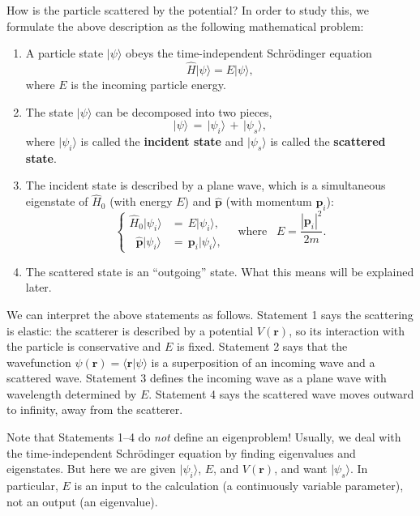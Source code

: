 \documentclass[prx,12pt]{revtex4-2}
\begin{document}
How is the particle scattered by the potential?  In order to study
this, we formulate the above description as the following mathematical
problem:
\begin{enumerate}
\item 
A particle state $|\psi\rangle$ obeys the time-independent
Schr\"odinger equation
\begin{equation}
  \hat{H} |\psi\rangle = E |\psi\rangle,
  \label{scatter1}
\end{equation}
where $E$ is the incoming particle energy.

\item
The state $|\psi\rangle$ can be decomposed into two pieces,
\begin{equation}
  |\psi\rangle \,=\, |\psi_i\rangle \,+\, |\psi_s\rangle,
  \label{scatter2}
\end{equation}
where $|\psi_i\rangle$ is called the \textbf{incident state} and
$|\psi_s\rangle$ is called the \textbf{scattered state}.

\item
The incident state is described by a plane wave, which is a
simultaneous eigenstate of $\hat{H}_0$ (with energy $E$) and
$\hat{\mathbf{p}}$ (with momentum $\mathbf{p}_i$):
\begin{equation}
  \begin{cases}
  \hat{H}_0 |\psi_i\rangle &= \, E |\psi_i\rangle, \\
  \;\;\hat{\mathbf{p}} |\psi_i\rangle &= \, \mathbf{p}_i |\psi_i\rangle,
  \end{cases}
  \quad \mathrm{where} \;\;\; E = \frac{|\mathbf{p}_i|^2}{2m}.
  \label{scatter3}
\end{equation}

\item
The scattered state is an ``outgoing'' state.  What this means will be
explained later.
\end{enumerate}
We can interpret the above statements as follows.  Statement 1 says the
scattering is elastic: the scatterer is described by a potential
$V(\mathbf{r})$, so its interaction with the particle is conservative
and $E$ is fixed.  Statement 2 says that the wavefunction
$\psi(\mathbf{r}) = \langle \mathbf{r} |\psi\rangle$ is a
superposition of an incoming wave and a scattered wave.  Statement 3
defines the incoming wave as a plane wave with wavelength determined
by $E$.  Statement 4 says the scattered wave moves outward to
infinity, away from the scatterer.

Note that Statements 1--4 do \textit{not} define an eigenproblem!
Usually, we deal with the time-independent Schr\"odinger equation by
finding eigenvalues and eigenstates.  But here we are given
$|\psi_i\rangle$, $E$, and $V(\mathbf{r})$, and want $|\psi_s\rangle$.
In particular, $E$ is an input to the calculation (a continuously
variable parameter), not an output (an eigenvalue).
\end{document}
